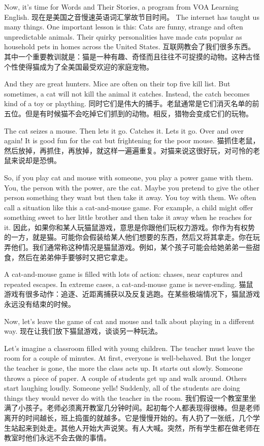 Now, it's time for Words and Their Stories, a program from VOA Learning English.
现在是美国之音慢速英语词汇掌故节目时间。
The internet has taught us many things. One important lesson is this: Cats are funny, strange and often unpredictable animals. Their quirky personalities have made cats popular as household pets in homes across the United States.
互联网教会了我们很多东西。其中一个重要教训就是：猫是一种有趣、奇怪而且往往不可捉摸的动物。这种古怪个性使得猫成为了全美国最受欢迎的家庭宠物。

And they are great hunters. Mice are often on their top five kill list. But sometimes, a cat will not kill the animal it catches. Instead, the catch becomes kind of a toy or plaything.
同时它们是伟大的捕手。老鼠通常是它们消灭名单的前五位。但是有时候猫不会吃掉它们抓到的动物。相反，猎物会变成它们的玩物。

The cat seizes a mouse. Then lets it go. Catches it. Lets it go. Over and over again! It is good fun for the cat but frightening for the poor mouse.
猫抓住老鼠，然后放掉，再抓住，再放掉，就这样一遍遍重复。对猫来说这很好玩，对可怜的老鼠来说却是恐惧。

So, if you play cat and mouse with someone, you play a power game with them. You, the person with the power, are the cat. Maybe you pretend to give the other person something they want but then take it away. You toy with them. We often call a situation like this a cat-and-mouse game. For example, a child might offer something sweet to her little brother and then take it away when he reaches for it.
因此，如果你和某人玩猫鼠游戏，意思是你跟他们玩权力游戏。你作为有权势的一方，就是猫。可能你会假装给某人他们想要的东西，然后又将其拿走。你在玩弄他们。我们通常称这种情况是猫鼠游戏。例如，某个孩子可能会给她弟弟一些甜食，然后在弟弟伸手要够时又把它拿走。

A cat-and-mouse game is filled with lots of action: chases, near captures and repeated escapes. In extreme cases, a cat-and-mouse game is never-ending.
猫鼠游戏有很多动作：追逐、近距离捕获以及反复逃跑。在某些极端情况下，猫鼠游戏永远没有结束的时候。

Now, let's leave the game of cat and mouse and talk about playing in a different way.
现在让我们放下猫鼠游戏，谈谈另一种玩法。

Let's imagine a classroom filled with young children. The teacher must leave the room for a couple of minutes. At first, everyone is well-behaved. But the longer the teacher is gone, the more the class acts up. It starts out slowly. Someone throws a piece of paper. A couple of students get up and walk around. Others start laughing loudly. Someone yells! Suddenly, all of the students are doing things they would never do with the teacher in the room.
我们假设一个教室里坐满了小孩子。老师必须离开教室几分钟时间。起初每个人都表现得很棒。但是老师离开的时间越长，班上捣蛋的就越多。它是慢慢开始的。有人扔了一张纸，几个学生站起来到处走。其他人开始大声说笑。有人大喊。突然，所有学生都在做老师在教室时他们永远不会去做的事情。


